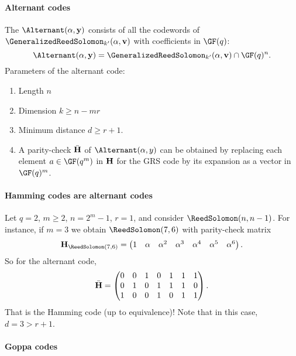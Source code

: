 \documentclass[a4paper, 11pt, openany]{book}
\begin{document}
\paragraph{Alternant codes}
The  $\Alternant({\bf \alpha}, {\bf y})$ consists of all the codewords of $\GeneralizedReedSolomon_{k'}( {\bf \alpha}, {\bf v} )$ with coefficients in $\GF(q)$:
\[
	\Alternant({\bf \alpha}, {\bf y}) = \GeneralizedReedSolomon_{k'}( {\bf \alpha}, {\bf v} ) \cap \GF(q)^n.
\]
Parameters of the alternant code:
\begin{enumerate}
	\item Length $n$

	\item Dimension $k \ge n-mr$

	\item Minimum distance $d \ge r+1$.

	\item A parity-check $\bar{\bf H}$ of $\Alternant(\alpha, y)$ can be obtained by replacing each element $a \in \GF(q^m)$ in ${\bf H}$ for the GRS code by its expansion as a vector in $\GF(q)^m$.
\end{enumerate}






\paragraph{Hamming codes are alternant codes}

Let $q=2$, $m \ge 2$, $n = 2^m - 1$, $r=1$, and consider $\ReedSolomon(n,n-1)$. For instance, if $m=3$ we obtain $\ReedSolomon(7,6)$ with parity-check matrix
\[
	{\bf H}_{\ReedSolomon(7,6)} = \begin{pmatrix}
	1 & \alpha & \alpha^2 & \alpha^3 & \alpha^4 & \alpha^5 & \alpha^6
	\end{pmatrix}.
\]
So for the alternant code,
\[
	\bar{\bf H}  = \begin{pmatrix}
	0 & 0 & 1 & 0 & 1 & 1 & 1 \\
	0 & 1 & 0 & 1 & 1 & 1 & 0 \\
	1 & 0 & 0 & 1 & 0 & 1 & 1
	\end{pmatrix}.
\]
That is the Hamming code (up to equivalence)! Note that in this case, $d = 3 > r + 1$.





\paragraph{Goppa codes}
\end{document}
